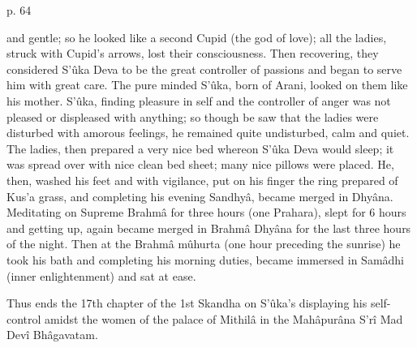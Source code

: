  

p. 64

 

and gentle; so he looked like a second Cupid (the god of love); all the ladies, struck with Cupid’s arrows, lost their consciousness. Then recovering, they considered S’ûka Deva to be the great controller of passions and began to serve him with great care. The pure minded S’ûka, born of Arani, looked on them like his mother. S’ûka, finding pleasure in self and the controller of anger was not pleased or displeased with anything; so though be saw that the ladies were disturbed with amorous feelings, he remained quite undisturbed, calm and quiet. The ladies, then prepared a very nice bed whereon S’ûka Deva would sleep; it was spread over with nice clean bed sheet; many nice pillows were placed. He, then, washed his feet and with vigilance, put on his finger the ring prepared of Kus'a grass, and completing his evening Sandhyâ, became merged in Dhyâna. Meditating on Supreme Brahmâ for three hours (one Prahara), slept for 6 hours and getting up, again became merged in Brahmâ Dhyâna for the last three hours of the night. Then at the Brahmâ mûhurta (one hour preceding the sunrise) he took his bath and completing his morning duties, became immersed in Samâdhi (inner enlightenment) and sat at ease.

 

Thus ends the 17th chapter of the 1st Skandha on S’ûka's displaying his self-control amidst the women of the palace of Mithilâ in the Mahâpurâna S’rî Mad Devî Bhâgavatam.